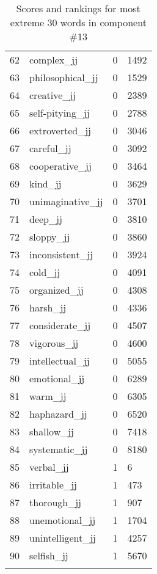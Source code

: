 \begin{longtable}[!htbp]{| rlr@{.}l |}
    62 & complex\_jj & 0 & 1492 \\
    63 & philosophical\_jj & 0 & 1529 \\
    64 & creative\_jj & 0 & 2389 \\
    65 & self-pitying\_jj & 0 & 2788 \\
    66 & extroverted\_jj & 0 & 3046 \\
    67 & careful\_jj & 0 & 3092 \\
    68 & cooperative\_jj & 0 & 3464 \\
    69 & kind\_jj & 0 & 3629 \\
    70 & unimaginative\_jj & 0 & 3701 \\
    71 & deep\_jj & 0 & 3810 \\
    72 & sloppy\_jj & 0 & 3860 \\
    73 & inconsistent\_jj & 0 & 3924 \\
    74 & cold\_jj & 0 & 4091 \\
    75 & organized\_jj & 0 & 4308 \\
    76 & harsh\_jj & 0 & 4336 \\
    77 & considerate\_jj & 0 & 4507 \\
    78 & vigorous\_jj & 0 & 4600 \\
    79 & intellectual\_jj & 0 & 5055 \\
    80 & emotional\_jj & 0 & 6289 \\
    81 & warm\_jj & 0 & 6305 \\
    82 & haphazard\_jj & 0 & 6520 \\
    83 & shallow\_jj & 0 & 7418 \\
    84 & systematic\_jj & 0 & 8180 \\
    85 & verbal\_jj & 1 & 6 \\
    86 & irritable\_jj & 1 & 473 \\
    87 & thorough\_jj & 1 & 907 \\
    88 & unemotional\_jj & 1 & 1704 \\
    89 & unintelligent\_jj & 1 & 4257 \\
    90 & selfish\_jj & 1 & 5670 \\
    \hline
    \caption{Scores and rankings for most extreme 30 words in component \#13} \\
\end{longtable}
